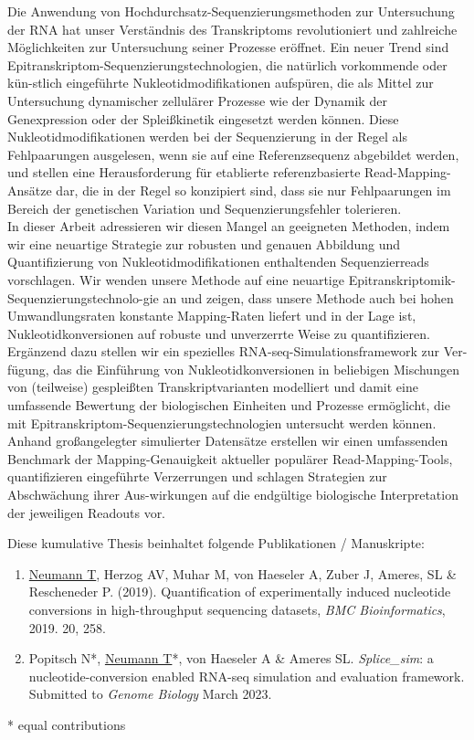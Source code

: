 Die Anwendung von Hochdurchsatz-Sequenzierungsmethoden zur Untersuchung der RNA hat unser Verst{\"a}ndnis des Transkriptoms revolutioniert und zahlreiche M{\"o}glichkeiten zur Untersuchung seiner Prozesse er{\"o}ffnet. Ein neuer Trend sind Epitranskriptom-Sequenzierungstechnologien, die nat{\"u}rlich vorkommende oder k{\"u}n-stlich eingef{\"u}hrte Nukleotidmodifikationen aufsp{\"u}ren, die als Mittel zur Untersuchung dynamischer zellul{\"a}rer Prozesse wie der Dynamik der Genexpression oder der Splei{\ss}kinetik eingesetzt werden k{\"o}nnen.  Diese Nukleotidmodifikationen werden bei der Sequenzierung in der Regel als Fehlpaarungen ausgelesen, wenn sie auf eine Referenzsequenz abgebildet werden, und stellen eine Herausforderung f{\"u}r etablierte referenzbasierte Read-Mapping-Ans{\"a}tze dar, die in der Regel so konzipiert sind, dass sie nur Fehlpaarungen im Bereich der genetischen Variation und Sequenzierungsfehler tolerieren. \\
In dieser Arbeit adressieren wir diesen Mangel an geeigneten Methoden, indem wir eine neuartige Strategie zur robusten und genauen Abbildung und Quantifizierung von Nukleotidmodifikationen enthaltenden Sequenzierreads vorschlagen. Wir wenden unsere Methode auf eine neuartige Epitranskriptomik-Sequenzierungstechnolo-gie an und zeigen, dass unsere Methode auch bei hohen Umwandlungsraten konstante Mapping-Raten liefert und in der Lage ist, Nukleotidkonversionen auf robuste und unverzerrte Weise zu quantifizieren. \\
Erg{\"a}nzend dazu stellen wir ein spezielles RNA-seq-Simulationsframework zur Ver-f{\"u}gung, das die Einf{\"u}hrung von Nukleotidkonversionen in beliebigen Mischungen von (teilweise) gesplei{\ss}ten Transkriptvarianten modelliert und damit eine umfassende Bewertung der biologischen Einheiten und Prozesse erm{\"o}glicht, die mit Epitranskriptom-Sequenzierungstechnologien untersucht werden k{\"o}nnen. Anhand gro{\ss}angelegter simulierter Datens{\"a}tze erstellen wir einen umfassenden Benchmark der Mapping-Genauigkeit aktueller popul{\"a}rer Read-Mapping-Tools, quantifizieren eingef{\"u}hrte Verzerrungen und schlagen Strategien zur Abschw{\"a}chung ihrer Aus-wirkungen auf die endg{\"u}ltige biologische Interpretation der jeweiligen Readouts vor.

\vspace*{4\baselineskip}

Diese kumulative Thesis beinhaltet folgende Publikationen / Manuskripte:

\begin{enumerate}[label=\roman*)]
\item \underline{Neumann T}, Herzog AV, Muhar M, von Haeseler A, Zuber J, Ameres, SL \& Rescheneder P. (2019). Quantification of experimentally induced nucleotide conversions in high-throughput sequencing datasets, \textit{BMC Bioinformatics}, 2019. 20, 258.
\item Popitsch N*, \underline{Neumann T}*, von Haeseler A \& Ameres SL. \textit{Splice\_sim}: a nucleotide-conversion enabled RNA-seq simulation and evaluation framework. Submitted to \textit{Genome Biology} March 2023.
\end{enumerate}
* equal contributions
\\\\


\vfill




